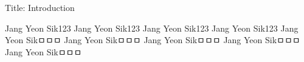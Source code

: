 Title: Introduction


Jang Yeon Sik123
Jang Yeon Sik123
Jang Yeon Sik123
Jang Yeon Sik123
Jang Yeon Sikㅁㅁㅁ
Jang Yeon Sikㅁㅁㅁ
Jang Yeon Sikㅁㅁㅁ
Jang Yeon Sikㅁㅁㅁ
Jang Yeon Sikㅁㅁㅁ